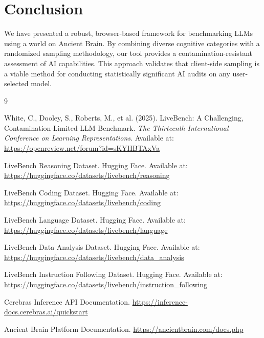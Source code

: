\documentclass[10pt, twocolumn, a4paper]{article}
\begin{document}
\section{Conclusion}
We have presented a robust, browser-based framework for benchmarking LLMs using a world on Ancient Brain. By combining diverse cognitive categories with a randomized sampling methodology, our tool provides a contamination-resistant assessment of AI capabilities. This approach validates that client-side sampling is a viable method for conducting statistically significant AI audits on any user-selected model.

\begin{thebibliography}{9}

White, C., Dooley, S., Roberts, M., et al. (2025).
LiveBench: A Challenging, Contamination-Limited LLM Benchmark.
\textit{The Thirteenth International Conference on Learning Representations}.
Available at: \url{https://openreview.net/forum?id=sKYHBTAxVa}

LiveBench Reasoning Dataset. Hugging Face. 
Available at: \url{https://huggingface.co/datasets/livebench/reasoning}

LiveBench Coding Dataset. Hugging Face. 
Available at: \url{https://huggingface.co/datasets/livebench/coding}

LiveBench Language Dataset. Hugging Face. 
Available at: \url{https://huggingface.co/datasets/livebench/language}

LiveBench Data Analysis Dataset. Hugging Face. 
Available at: \url{https://huggingface.co/datasets/livebench/data_analysis}

LiveBench Instruction Following Dataset. Hugging Face. 
Available at: \url{https://huggingface.co/datasets/livebench/instruction_following}

Cerebras Inference API Documentation.
\url{https://inference-docs.cerebras.ai/quickstart}

Ancient Brain Platform Documentation.
\url{https://ancientbrain.com/docs.php}
\end{thebibliography}
\end{document}
